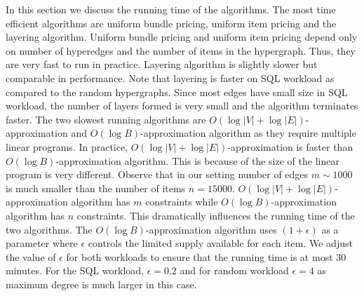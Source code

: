  In this section we discuss the running time of the algorithms. The most time efficient algorithms are uniform bundle pricing, uniform item pricing and the layering algorithm. Uniform bundle pricing and uniform item pricing depend only on number of hyperedges and the number of items in the hypergraph. Thus, they are very fast to run in practice. Layering algorithm is slightly slower but comparable in performance. Note that layering is faster on SQL workload as compared to the random hypergraphs. Since most edges have small size in SQL workload, the number of layers formed is very small and the algorithm terminates faster. The two slowest running algorithms are $O(\log |V| + \log |E|)$-approximation and $O(\log B)$-approximation algorithm as they require multiple linear programs. In practice, $O(\log |V| + \log |E|)$-approximation is faster than $O(\log B)$-approximation algorithm. This is because of the size of the linear program is very different. Observe that in our setting number of edges $m \sim 1000$ is much smaller than the number of items $n = 15000$. $O(\log |V| + \log |E|)$-approximation algorithm has $m$ constraints while $O(\log B)$-approximation algorithm has $n$ constraints. This dramatically influences the running time of the two algorithms. The $O(\log B)$-approximation algorithm uses $(1+\epsilon)$ as a parameter where $\epsilon$ controls the limited supply available for each item. We adjust the value of $\epsilon$ for both workloads to ensure that the running time is at most $30$ minutes. For the SQL workload, $\epsilon = 0.2$ and for random workload $\epsilon = 4$ as maximum degree is much larger in this case.
 